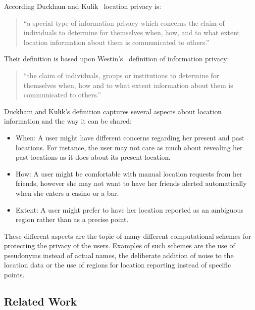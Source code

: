 According Duckham and Kulik~\cite{duckham2006location} location
privacy is:
\begin{quotation}
  ``a special type of information privacy which concerns the claim
  of individuals to determine for themselves when, how, and to what
  extent location information about them is communicated to others.''
\end{quotation}
Their definition is based upon Westin's~\cite{westin1968privacy}
definition of information privacy:
\begin{quotation}
  ``the claim of individuals, groups or institutions to determine for
  themselves when, how and to what extent information about them is
  communicated to others.''
\end{quotation}
Duckham and Kulik's definition captures several aspects about
location information and the way it can be shared:
\begin{itemize}
\item When: A user might have different concerns regarding her present
  and past locations. For instance, the user may not care as much
  about revealing her past locations as it does about its present
  location.
\item How: A user might be comfortable with manual location requests
  from her friends, however she may not want to have her friends
  alerted automatically when she enters a casino or a bar.
\item Extent: A user might prefer to have her location reported as an
  ambiguous region rather than as a precise point.
\end{itemize}
These different aspects are the topic of many different
computational schemes for protecting the privacy of the users.
Examples of such schemes are the use of pseudonyms instead of actual
names, the deliberate addition of noise to the location data or the use
of regions for location reporting instead of specific points.

\subsection{Related Work}
\label{sec:lp_related_work}


